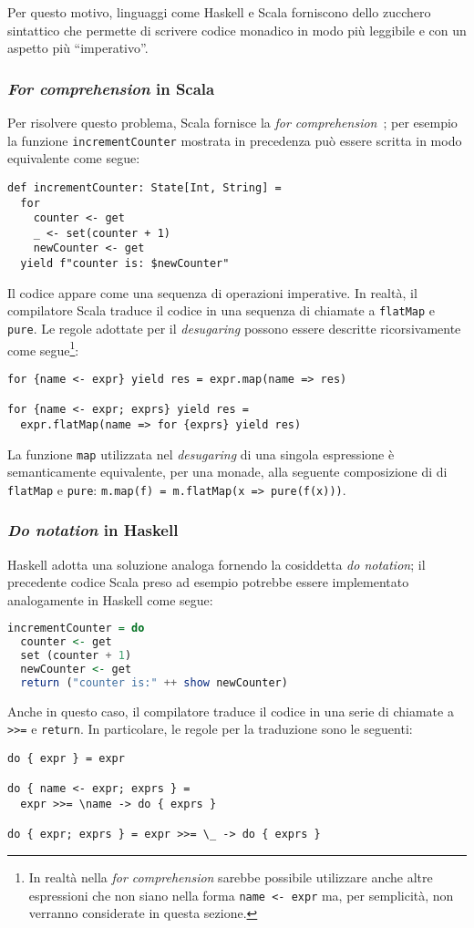 Per questo motivo, linguaggi come Haskell e Scala forniscono dello zucchero sintattico che permette di scrivere codice monadico in modo più leggibile e con un aspetto più ``imperativo''.

\subsubsection{\emph{For comprehension} in Scala}
Per risolvere questo problema, Scala fornisce la \emph{for comprehension}~\cite{cit:scala-book-control-structures}; per esempio la funzione \lstinline{incrementCounter} mostrata in precedenza può essere scritta in modo equivalente come segue:
\begin{lstlisting}[language=scala3]
def incrementCounter: State[Int, String] =
  for
    counter <- get
    _ <- set(counter + 1)
    newCounter <- get
  yield f"counter is: $newCounter"
\end{lstlisting}

Il codice appare come una sequenza di operazioni imperative. In realtà, il compilatore Scala traduce il codice in una sequenza di chiamate a \lstinline{flatMap} e \lstinline{pure}.
Le regole adottate per il \emph{desugaring} possono essere descritte ricorsivamente come segue\footnote{In realtà nella \emph{for comprehension} sarebbe possibile utilizzare anche altre espressioni che non siano nella forma \lstinline{name <- expr} ma, per semplicità, non verranno considerate in questa sezione.}: 

\begin{lstlisting}
for {name <- expr} yield res = expr.map(name => res)

for {name <- expr; exprs} yield res =
  expr.flatMap(name => for {exprs} yield res)
\end{lstlisting}

La funzione \lstinline{map} utilizzata nel \emph{desugaring} di una singola espressione è semanticamente equivalente, per una monade, alla seguente composizione di di \lstinline{flatMap} e \lstinline{pure}: \lstinline{m.map(f) = m.flatMap(x => pure(f(x)))}.

\subsubsection{\emph{Do notation} in Haskell}
Haskell adotta una soluzione analoga fornendo la cosiddetta \emph{do notation}; il precedente codice Scala preso ad esempio potrebbe essere implementato analogamente in Haskell come segue:
\begin{lstlisting}[language=haskell]
incrementCounter = do
  counter <- get
  set (counter + 1)
  newCounter <- get
  return ("counter is:" ++ show newCounter)
\end{lstlisting}
Anche in questo caso, il compilatore traduce il codice in una serie di chiamate a \lstinline{>>=} e \lstinline{return}. In particolare, le regole per la traduzione sono le seguenti:
\begin{lstlisting}
do { expr } = expr

do { name <- expr; exprs } =
  expr >>= \name -> do { exprs }

do { expr; exprs } = expr >>= \_ -> do { exprs }
\end{lstlisting}

